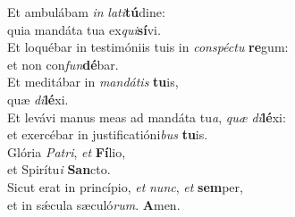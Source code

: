 \oddverse Et ambulábam \textit{in} \textit{la}\textit{ti}\textbf{tú}dine:~\*\\
\oddverse quia mandáta tua ex\textit{qui}\textbf{sí}vi.\\
\evenverse Et loquébar in testimóniis tuis in \textit{con}\textit{spé}\textit{ctu} \textbf{re}gum:~\*\\
\evenverse et non con\textit{fun}\textbf{dé}bar.\\
\oddverse Et meditábar in \textit{man}\textit{dá}\textit{tis} \textbf{tu}is,~\*\\
\oddverse quæ \textit{di}\textbf{lé}xi.\\
\evenverse Et levávi manus meas ad mandáta tu\textit{a}, \textit{quæ} \textit{di}\textbf{lé}xi:~\*\\
\evenverse et exercébar in justificatióni\textit{bus} \textbf{tu}is.\\
\oddverse Glória \textit{Pa}\textit{tri}, \textit{et} \textbf{Fí}lio,~\*\\
\oddverse et Spirítu\textit{i} \textbf{San}cto.\\
\evenverse Sicut erat in princípio, \textit{et} \textit{nunc}, \textit{et} \textbf{sem}per,~\*\\
\evenverse et in sǽcula sæculó\textit{rum}. \textbf{A}men.\\
